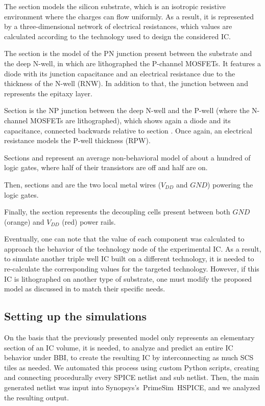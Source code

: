 \documentclass[10pt, conference, compsocconf]{IEEEtran}
\begin{document}
The section  models the silicon substrate, which is an isotropic resistive environment where the charges can flow uniformly.
As a result, it is represented by a three-dimensional network of electrical resistances, which values are calculated according to the technology used to design the considered IC.

The section  is the model of the PN junction present between the substrate and the deep N-well, in which are lithographed the P-channel MOSFETs.
It features a diode with its junction capacitance and an electrical resistance due to the thickness of the N-well (RNW).
In addition to that, the junction between  and  represents the epitaxy layer.

Section  is the NP junction between the deep N-well and the P-well (where the N-channel MOSFETs are lithographed), which shows again a diode and its capacitance, connected backwards relative to section .
Once again, an electrical resistance models the P-well thickness (RPW).

Sections  and  represent an average non-behavioral model of about a hundred of logic gates, where half of their transistors are off and half are on.

Then, sections  and  are the two local metal wires ($V_{DD}$ and $GND$) powering the logic gates.

Finally, the section  represents the decoupling cells present between both $GND$ (orange) and $V_{DD}$ (red) power rails.

Eventually, one can note that the value of each component was calculated to approach the behavior of the technology node of the experimental IC.
As a result, to simulate another triple well IC built on a different technology, it is needed to re-calculate the corresponding values for the targeted technology.
However, if this IC is lithographed on another type of substrate, one must modify the proposed model as discussed in \cite{mybbi2} to match their specific needs.

\subsection{Setting up the simulations}
\label{subsection:simScsSetup}

On the basis that the previously presented model only represents an elementary section of an IC volume, it is needed, to analyze and predict an entire IC behavior under BBI, to create the resulting IC by interconnecting as much SCS tiles as needed.
We automated this process using custom Python scripts, creating and connecting procedurally every SPICE netlist and sub netlist.
Then, the main generated netlist was input into \mbox{Synopsys\textregistered's PrimeSim HSPICE}, and we analyzed the resulting output.
\end{document}
